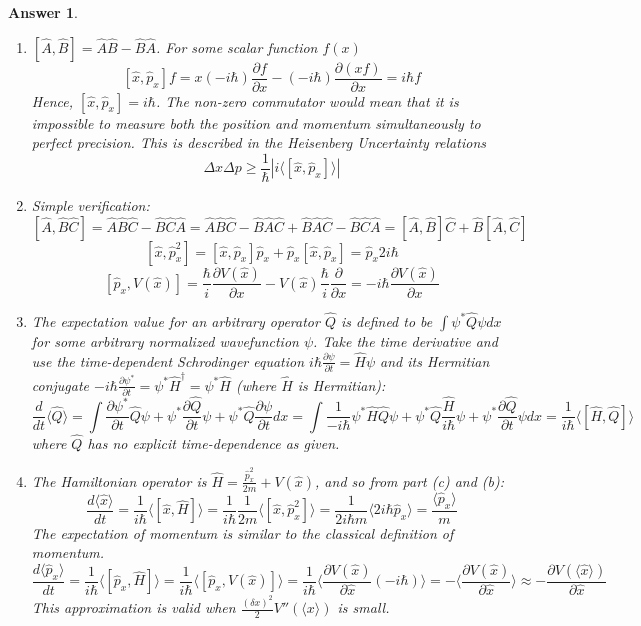 \documentclass[a4paper]{article}
\newtheorem{ans}{Answer}[subsection]
\theoremstyle{new}
\begin{document}
\begin{ans}\leavevmode
\begin{enumerate}[label=(\alph*)]
\item $[\hat{A},\hat{B}]=\hat{A}\hat{B}-\hat{B}\hat{A}$. For some scalar function $f(x)$
$$[\hat{x},\hat{p}_x]f=x(-i\hbar)\frac{\partial f}{\partial x}-(-i\hbar)\frac{\partial(xf)}{\partial x}=i\hbar f$$
Hence, $[\hat{x},\hat{p}_x]=i\hbar$. The non-zero commutator would mean that it is impossible to measure both the position and momentum simultaneously to perfect precision. This is described in the Heisenberg Uncertainty relations
$$\Delta x\Delta p\geq\frac{1}{\hbar}|i\langle[\hat{x},\hat{p}_x]\rangle|$$
\item Simple verification:
$$[\hat{A},\hat{B}\hat{C}]=\hat{A}\hat{B}\hat{C}-\hat{B}\hat{C}\hat{A}=\hat{A}\hat{B}\hat{C}-\hat{B}\hat{A}\hat{C}+\hat{B}\hat{A}\hat{C}-\hat{B}\hat{C}\hat{A}=[\hat{A},\hat{B}]\hat{C}+\hat{B}[\hat{A},\hat{C}]$$
$$[\hat{x},\hat{p}_x^2]=[\hat{x},\hat{p}_x]\hat{p}_x+\hat{p}_x[\hat{x},\hat{p}_x]=\hat{p}_x2i\hbar$$
$$[\hat{p}_x,V(\hat{x})]=\frac{\hbar}{i}\frac{\partial V(\hat{x})}{\partial x}-V(\hat{x})\frac{\hbar}{i}\frac{\partial}{\partial x}=-i\hbar\frac{\partial V(\hat{x})}{\partial x}$$
\item The expectation value for an arbitrary operator $\hat{Q}$ is defined to be $\int\psi^*\hat{Q}\psi dx$ for some arbitrary normalized wavefunction $\psi$. Take the time derivative and use the time-dependent Schrodinger equation $i\hbar\frac{\partial\psi}{\partial t}=\hat{H}\psi$ and its Hermitian conjugate $-i\hbar\frac{\partial\psi^*}{\partial t}=\psi^*\hat{H}^\dag=\psi^*\hat{H}$ (where $\hat{H}$ is Hermitian):
$$\frac{d}{dt}\langle\hat{Q}\rangle=\int\frac{\partial\psi^*}{\partial t}\hat{Q}\psi+\psi^*\frac{\partial\hat{Q}}{\partial t}\psi+\psi^*\hat{Q}\frac{\partial\psi}{\partial t}dx=\int\frac{1}{-i\hbar}\psi^*\hat{H}\hat{Q}\psi+\psi^*\hat{Q}\frac{\hat{H}}{i\hbar}\psi+\psi^*\frac{\partial\hat{Q}}{\partial t}\psi dx=\frac{1}{i\hbar}\langle[\hat{H},\hat{Q}]\rangle$$
where $\hat{Q}$ has no explicit time-dependence as given.
\item The Hamiltonian operator is $\hat{H}=\frac{\hat{p}_x^2}{2m}+V(\hat{x})$, and so from part (c) and (b):
$$\frac{d\langle\hat{x}\rangle}{dt}=\frac{1}{i\hbar}\langle[\hat{x},\hat{H}]\rangle=\frac{1}{i\hbar}\frac{1}{2m}\langle[\hat{x},\hat{p}_x^2]\rangle=\frac{1}{2i\hbar m}\langle 2i\hbar\hat{p}_x\rangle=\frac{\langle\hat{p}_x\rangle}{m}$$
The expectation of momentum is similar to the classical definition of momentum.
$$\frac{d\langle\hat{p}_x\rangle}{dt}=\frac{1}{i\hbar}\langle[\hat{p}_x,\hat{H}]\rangle=\frac{1}{i\hbar}\langle[\hat{p}_x,V(\hat{x})]\rangle=\frac{1}{i\hbar }\bigg\langle\frac{\partial V(\hat{x})}{\partial\hat{x}}(-i\hbar)\bigg\rangle=-\bigg\langle\frac{\partial V(\hat{x})}{\partial\hat{x}}\bigg\rangle\approx-\frac{\partial V(\langle\hat{x}\rangle)}{\partial\hat{x}}$$
This approximation is valid when $\frac{(\delta x)^2}{2}V''(\langle x\rangle)$ is small.
\end{enumerate}
\end{ans}
\newpage
\end{document}
